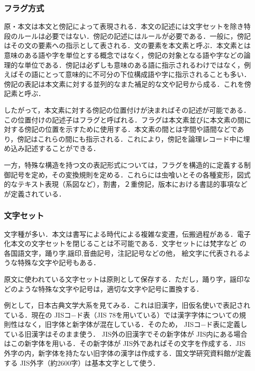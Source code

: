 \subsubsection{フラグ方式}
\label{sec:3.2.2setu}

原・本文は本文と傍記によって表現される．本文の記述には文字セットを除き特
段のルールは必要ではない．傍記の記述にはルールが必要である．一般に，傍記
はその文の要素への指示として表される．文の要素を本文素と呼ぶ．本文素とは
意味のある語や字を単位とする概念ではなく，傍記の対象となる語や字などの論
理的な単位である．傍記は必ずしも意味のある語に指示されるわけではなく，例
えばその語にとって意味的に不可分の下位構成語や字に指示されることも多い．
傍記の表記は本文素に対する並列的なまた補足的な文や記号から成る．これを傍
記素と呼ぶ．

したがって，本文素に対する傍記の位置付けが決まればその記述が可能である．
この位置付けの記述子はフラグと呼ばれる．フラグは本文素並びに本文素の間に
対する傍記の位置を示すために使用する．本文素の間とは字間や語間などであ
り，傍記はこれらの間にも指示される．これにより，傍記を論理レコード中に埋
め込み記述することができる．

一方，特殊な構造を持つ文の表記形式については，フラグを構造的に定義する制
御記号を定め，その変換規則を定める．これらには虫喰いとその各種変形，図式
的なテキスト表現（系図など），割書，２重傍記，版本における書誌的事項など
が定義されている．


\subsubsection{文字セット}
\label{sec:3.2.3setu}

文字種が多い．本文は書写による時代による複雑な変遷，伝搬過程がある．電子
化本文の文字セットを閉じることは不可能である．文字セットには梵字\yougo など
の各国語文字，踊り字\yougo ,謡印\yougo ,音曲記号，注記記号などの他，
絵文字に代表されるような特殊な文字や記号もある．

原文に使われている文字セットは原則として保存する．ただし，踊り字，謡印な
どのような特殊な文字や記号は，適切な文字や記号に置換する．

例として，日本古典文学大系を見てみる．これは旧漢字，旧仮名使いで表記され
ている．現在の JISコ−ド表（JIS 78を用いている）では漢字字体についての規
則性はなく，旧字体と新字体が混在している．そのため， JISコ−ド表に定義し
ている旧漢字はそのまま使う． JIS外の旧漢字でその新字体が JIS内にある場合
はこの新字体を用いる．その新字体が JIS外であればその文字を作成する．JIS 
外字の内，新字体を持たない旧字体の漢字は作成する．国文学研究資料館が定義
する JIS外字（約2600字）は基本文字として使う．

